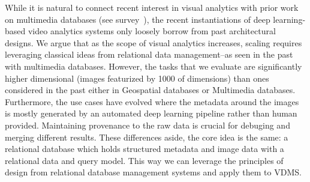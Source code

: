 While it is natural to connect recent interest in visual analytics with prior work on multimedia databases (see survey~\cite{yoshitaka1999survey}), the recent instantiations of deep learning-based video analytics systems only loosely borrow from past architectural designs.
We argue that as the scope of visual analytics increases, scaling requires leveraging classical ideas from relational data management--as seen in the past with multimedia databases.
However, the tasks that we evaluate are significantly higher dimensional (images featurized by 1000 of dimensions) than ones considered in the past either in Geospatial databases or Multimedia databases.
Furthermore, the use cases have evolved where the metadata around the images is mostly generated by an automated deep learning pipeline rather than human provided.
Maintaining provenance to the raw data is crucial for debuging and merging different results. 
These differences aside, the core idea is the same: a relational database which holds structured metadata and image data with a relational data and query model. 
This way we can leverage the principles of design from relational database management systems and apply them to VDMS.











